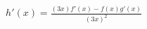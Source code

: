 \documentclass[preview]{standalone}
\begin{document}
\begin{align*}
h'(x) = \frac{(3x)f'(x)-f(x)g'(x)}{(3x)^2}
\end{align*}
\end{document}
